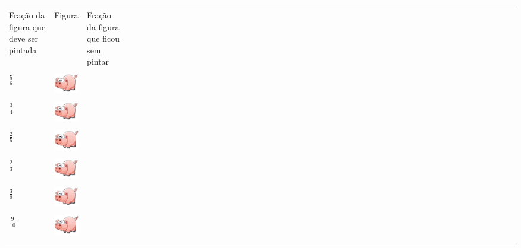 \documentclass[a4,12pt]{book}
\begin{document}
\begin{center}
  \begin{tabulary}{0.8\textwidth}{*{50}{L}}
    \hline \hline \\
      Fração da figura que deve ser pintada  &   Figura  &   Fração da figura que ficou sem pintar  \\
    \hline \\
      $\frac{5}{6}$  &   \includegraphics[width=30pt, keepaspectratio]{pig}  &  \\
    \hline \\
      $\frac{3}{4}$  &   \includegraphics[width=30pt, keepaspectratio]{pig}  &  \\
    \hline \\
      $\frac{2}{5}$  &   \includegraphics[width=36pt, keepaspectratio]{pig}  &  \\
    \hline \\
      $\frac{2}{3}$  &   \includegraphics[width=30pt, keepaspectratio]{pig}  &  \\
    \hline \\
      $\frac{3}{8}$  &   \includegraphics[width=30pt, keepaspectratio]{pig}  &  \\
    \hline \\
      $\frac{9}{10}$  &   \includegraphics[width=36pt, keepaspectratio]{pig}  &  \\
    \hline \\
  \end{tabulary}
\end{center}
\end{document}
